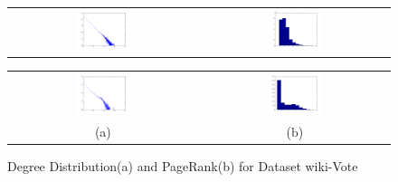 \begin{figure}[H]
\begin{center}
\begin{tabular}{cc}
     \includegraphics[width=0.3\textwidth]{FIG/soc-degreedist.png} &
     \includegraphics[width=0.3\textwidth]{FIG/soc-pagerank.png} \\
\end{tabular}
\caption{Degree Distribution(a) and PageRank(b) for Dataset SOC-Epinions1}

\begin{tabular}{cc}
\includegraphics[width=0.3\textwidth]{FIG/wiki-degreedist.png} &
     \includegraphics[width=0.3\textwidth]{FIG/wiki-pagerank.png} \\

    (a) & (b)
\end{tabular}
\caption{Degree Distribution(a) and PageRank(b) for Dataset wiki-Vote}

\end{center}
\end{figure}

